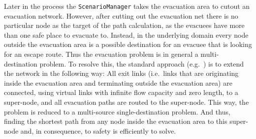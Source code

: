 Later in the process the \verb+ScenarioManager+ takes the evacuation area to cutout an evacuation network. However, after cutting out the evacuation net there is no particular node as the target of the path
calculation, as the evacuees have more than one safe place to evacuate to. Instead,
in the underlying domain every node outside the evacuation area is a possible
destination for an evacuee that is looking for an escape route. Thus the evacuation problem is in general a multi-destination problem. To resolve this,
the standard approach (e.g.~\citet{FordFulkerson1962FlowsInNetworks,LuGeorgeEtAl2005CapacityConstrainedRouting})
is to extend the network in the following way: All exit links (i.e.\ links that are originating inside the evacuation area and terminating outside the evacuation area) are connected, using virtual links with infinite flow capacity
and zero length, to a super-node, and all evacuation paths are routed to the super-node. This way, the problem is reduced to a multi-source single-destination problem. And thus, finding the shortest path from any node inside the evacuation area to this super-node and, in consequence, to safety is efficiently to solve.


